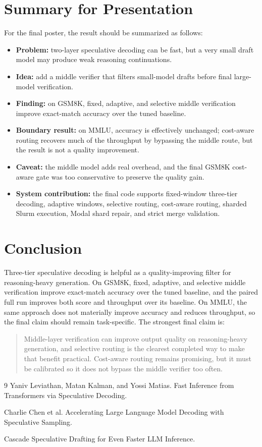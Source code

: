 \documentclass[11pt]{article}
\begin{document}
\section{Summary for Presentation}

For the final poster, the result should be summarized as follows:

\begin{itemize}
  \item \textbf{Problem:} two-layer speculative decoding can be fast, but a very small draft model may produce weak reasoning continuations.
  \item \textbf{Idea:} add a middle verifier that filters small-model drafts before final large-model verification.
  \item \textbf{Finding:} on GSM8K, fixed, adaptive, and selective middle verification improve exact-match accuracy over the tuned baseline.
  \item \textbf{Boundary result:} on MMLU, accuracy is effectively unchanged; cost-aware routing recovers much of the throughput by bypassing the middle route, but the result is not a quality improvement.
  \item \textbf{Caveat:} the middle model adds real overhead, and the final GSM8K cost-aware gate was too conservative to preserve the quality gain.
  \item \textbf{System contribution:} the final code supports fixed-window three-tier decoding, adaptive windows, selective routing, cost-aware routing, sharded Slurm execution, Modal shard repair, and strict merge validation.
\end{itemize}

\section{Conclusion}

Three-tier speculative decoding is helpful as a quality-improving filter for reasoning-heavy generation. On GSM8K, fixed, adaptive, and selective middle verification improve exact-match accuracy over the tuned baseline, and the paired full run improves both score and throughput over its baseline. On MMLU, the same approach does not materially improve accuracy and reduces throughput, so the final claim should remain task-specific. The strongest final claim is:

\begin{quote}
Middle-layer verification can improve output quality on reasoning-heavy generation, and selective routing is the clearest completed way to make that benefit practical. Cost-aware routing remains promising, but it must be calibrated so it does not bypass the middle verifier too often.
\end{quote}

\begin{thebibliography}{9}
Yaniv Leviathan, Matan Kalman, and Yossi Matias. Fast Inference from Transformers via Speculative Decoding.

Charlie Chen et al. Accelerating Large Language Model Decoding with Speculative Sampling.

Cascade Speculative Drafting for Even Faster LLM Inference.
\end{thebibliography}
\end{document}
